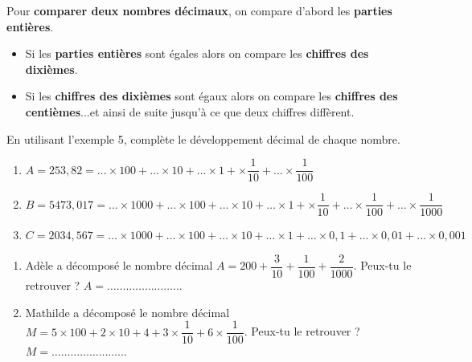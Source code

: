 \begin{pageCours}
\begin{Mt}
Pour \textbf{comparer deux nombres décimaux}, on compare d'abord les \textbf{parties entières}.
\begin{itemize}[leftmargin=*]
\item Si les \textbf{parties entières} sont égales alors on compare les \textbf{chiffres des dixièmes}.
\item Si les \textbf{chiffres des dixièmes} sont égaux alors on compare les \textbf{chiffres des centièmes}...et ainsi de suite jusqu'à ce que deux chiffres diffèrent.
\end{itemize}
\end{Mt}


\end{pageCours} 

\begin{pageAD} 




En utilisant l'exemple 5, complète le développement décimal de chaque nombre.
\begin{enumerate}

\item $A = 253,82 = \ldots \times 100 + \ldots \times 10 + \ldots  \times 1 +  \times\dfrac{1}{10} + \ldots \times\dfrac{1}{100} $

\item $B = 5473,017 = \ldots \times 1000 + \ldots \times 100 + \ldots \times 10 + \ldots  \times 1 +  \times\dfrac{1}{10} + \ldots \times\dfrac{1}{100}+ \ldots \times\dfrac{1}{1000} $ \vspace{0.2cm}


\item $C = 2034,567 = \ldots \times 1000 + \ldots \times 100 + \ldots \times 10 + \ldots  \times 1 +  \ldots \times 0,1 + \ldots \times 0,01+ \ldots \times 0,001 $
\end{enumerate}





\begin{enumerate}

\item Adèle a décomposé le nombre décimal  $A = 200 + \dfrac{3}{10} + \dfrac{1}{100} +  \dfrac{2}{1000} $. Peux-tu le retrouver ?
$A= \ldots\ldots\ldots\ldots\ldots\ldots\ldots\ldots $

\item Mathilde a décomposé le nombre décimal  $M = 5\times 100 + 2\times 10 + 4 + 3\times \dfrac{1}{10} +  6\times \dfrac{1}{100} $. Peux-tu le retrouver ?
$M = \ldots\ldots\ldots\ldots\ldots\ldots\ldots\ldots $


\end{enumerate}
\end{pageAD}
